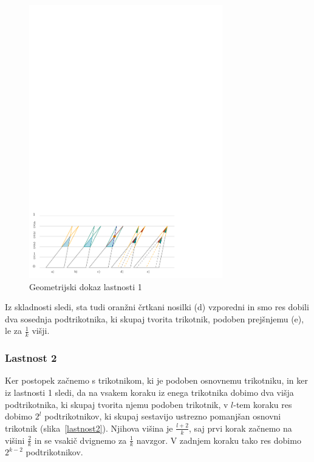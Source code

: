 \documentclass[a4paper, 12pt]{article}
\begin{document}
\begin{figure}[h!]
    \centering
    \includegraphics[width=0.75\textwidth]{ipe_slike/uhlji.pdf}
    \caption{Geometrijski dokaz lastnosti 1}
    \label{uhlji}
\end{figure}

Iz skladnosti sledi, sta tudi oranžni črtkani nosilki (d) vzporedni in smo res dobili dva sosednja podtrikotnika, ki skupaj tvorita trikotnik, podoben prejšnjemu (e), le za $ \frac{1}{k} $ višji.


\subsubsection*{Lastnost 2}

Ker postopek začnemo s trikotnikom, ki je podoben osnovnemu trikotniku, in ker iz lastnosti 1 sledi, da na vsakem koraku iz enega trikotnika dobimo dva višja podtrikotnika, ki skupaj tvorita njemu podoben trikotnik, v $ l $-tem koraku res dobimo $ 2^l $ podtrikotnikov, ki skupaj sestavijo ustrezno pomanjšan osnovni trikotnik (slika~\ref{lastnost2}). Njihova višina je $ \frac{l+2}{k} $, saj prvi korak začnemo na višini $ \frac{2}{k} $ in se vsakič dvignemo za $ \frac{1}{k} $ navzgor. V zadnjem koraku tako res dobimo $ 2^{k-2} $ podtrikotnikov.
\end{document}
